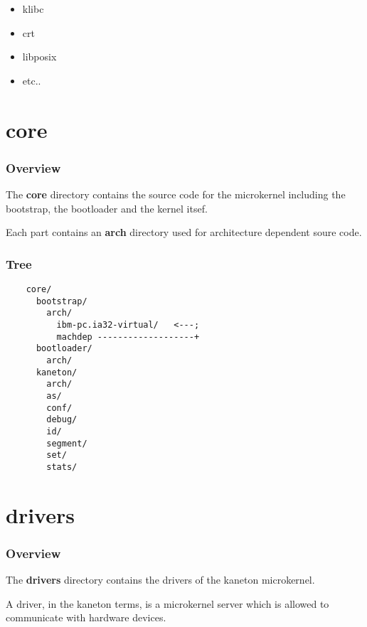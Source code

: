 {\begin{frame}
  \begin{itemize}
    \item
      klibc
    \item
      crt
    \item
      libposix
    \item
      etc..
  \end{itemize}
\end{frame}

%
%

\section{core}


\begin{frame}
  \frametitle{Overview}

  The \textbf{core} directory contains the source code for the microkernel
  including the bootstrap, the bootloader and the kernel itsef.

  \nl

  Each part contains an \textbf{arch} directory used for architecture
  dependent soure code.
\end{frame}


\begin{frame}[containsverbatim]
  \frametitle{Tree}

  \begin{verbatim}
    core/
      bootstrap/
        arch/
          ibm-pc.ia32-virtual/   <---;
          machdep -------------------+
      bootloader/
        arch/
      kaneton/
        arch/
        as/
        conf/
        debug/
        id/
        segment/
        set/
        stats/
  \end{verbatim}
\end{frame}

%
%

\section{drivers}


\begin{frame}
  \frametitle{Overview}

  The \textbf{drivers} directory contains the drivers of the kaneton
  microkernel.

  \nl

  A driver, in the kaneton terms, is a microkernel server which is allowed
  to communicate with hardware devices.
\end{frame}

}
